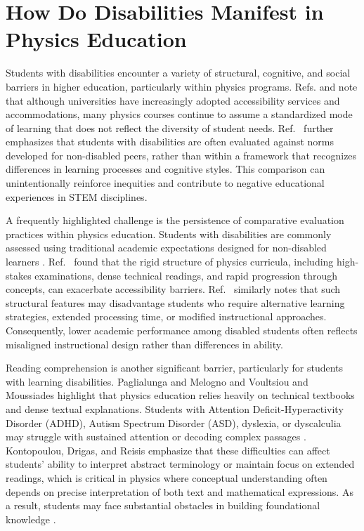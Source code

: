 \documentclass[]{aastex701}
\begin{document}
\section{How Do Disabilities Manifest in Physics Education}
\label{sec:disability_STEMEd}
Students with disabilities encounter a variety of structural, cognitive, and social barriers in higher education, particularly within physics programs. Refs. \cite{Chasen2025} and \cite{Gull2025} note that although universities have increasingly adopted accessibility services and accommodations, many physics courses continue to assume a standardized mode of learning that does not reflect the diversity of student needs. Ref.~\cite{Chasen2025} further emphasizes that students with disabilities are often evaluated against norms developed for non-disabled peers, rather than within a framework that recognizes differences in learning processes and cognitive styles. This comparison can unintentionally reinforce inequities and contribute to negative educational experiences in STEM disciplines.

A frequently highlighted challenge is the persistence of comparative evaluation practices within physics education. Students with disabilities are commonly assessed using traditional academic expectations designed for non-disabled learners \autocite{Chasen2025, AlAzawei2023}. Ref.~\cite{Chasen2025} found that the rigid structure of physics curricula, including high-stakes examinations, dense technical readings, and rapid progression through concepts, can exacerbate accessibility barriers. Ref.~\cite{Almufareh2025} similarly notes that such structural features may disadvantage students who require alternative learning strategies, extended processing time, or modified instructional approaches. Consequently, lower academic performance among disabled students often reflects misaligned instructional design rather than differences in ability.

Reading comprehension is another significant barrier, particularly for students with learning disabilities. Paglialunga and Melogno \autocite{Paglialunga2025} and Voultsiou and Moussiades \autocite{Voultsiou2025} highlight that physics education relies heavily on technical textbooks and dense textual explanations. Students with Attention Deficit-Hyperactivity Disorder (ADHD), Autism Spectrum Disorder (ASD), dyslexia, or dyscalculia may struggle with sustained attention or decoding complex passages \autocite{Paglialunga2025, Voultsiou2025, HarkinsBrown2025}. Kontopoulou, Drigas, and Reisis \autocite{Kontopoulou2024} emphasize that these difficulties can affect students' ability to interpret abstract terminology or maintain focus on extended readings, which is critical in physics where conceptual understanding often depends on precise interpretation of both text and mathematical expressions. As a result, students may face substantial obstacles in building foundational knowledge \autocite{Paglialunga2025, Sweller2011}.
\end{document}
